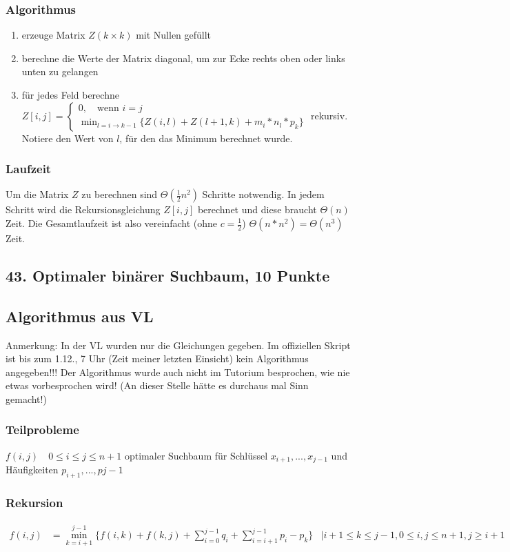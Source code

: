 \documentclass[ngerman,a4paper]{report}
\begin{document}
\subsubsection*{Algorithmus}
\begin{enumerate}
\item erzeuge Matrix $Z (k \times k)$ mit Nullen gefüllt
\item berechne die Werte der Matrix diagonal, um zur Ecke rechts oben oder links unten zu gelangen 
\item für jedes Feld berechne $Z[i,j] = \begin{cases} 0, \quad\text{wenn } i = j \\ \min_{l = i \rightarrow k-1}\{Z(i,l) + Z(l+1,k) + m_i * n_l * p_k \}\end{cases}$ rekursiv. Notiere den Wert von $l$, für den das Minimum berechnet wurde.
\end{enumerate}
\subsubsection*{Laufzeit}
Um die Matrix $Z$ zu berechnen sind $\Theta(\frac{1}{2}n^2)$ Schritte notwendig. In jedem Schritt wird die Rekursionsgleichung $Z[i,j]$ berechnet und diese braucht $\Theta(n)$ Zeit. Die Gesamtlaufzeit ist also vereinfacht (ohne $c=\frac{1}{2}$) $\Theta(n*n^2) = \Theta(n^3)$ Zeit.
\subsection*{43. Optimaler binärer Suchbaum, 10 Punkte}
\subsection*{Algorithmus aus VL}
Anmerkung: In der VL wurden nur die Gleichungen gegeben. Im offiziellen Skript ist bis zum 1.12., 7 Uhr (Zeit meiner letzten Einsicht) kein Algorithmus angegeben!!! Der Algorithmus wurde auch nicht im Tutorium besprochen, wie nie etwas vorbesprochen wird! (An dieser Stelle hätte es durchaus mal Sinn gemacht!)
\subsubsection*{Teilprobleme}
$f(i,j)\quad 0\leq i \leq j \leq n+1$ optimaler Suchbaum für Schlüssel $x_{i+1}, ... , x_{j-1}$ und Häufigkeiten $p_{i+1},...,p{j-1}$
\subsubsection*{Rekursion}
\begin{align*}
f(i,j) &= \min_{k = i+1}^{j-1} \{ f(i,k) + f(k,j) + \sum_{i=0}^{j-1}q_i + \sum_{i = i+1}^{j-1} p_{i} - p_{k} \}&| i+1\leq k \leq j-1, 0 \leq i, j \leq n+1, j \geq i+1\\
\end{align*}
\end{document}
